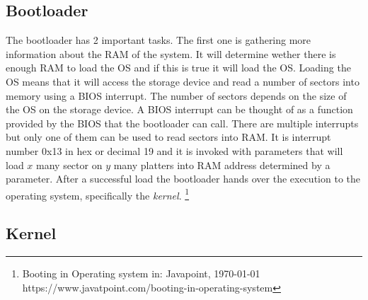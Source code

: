 \subsection{Bootloader}

The bootloader has 2 important tasks. The first one is gathering more
information about the RAM of the system. It will determine wether there is
enough RAM to load the OS and if this is true it will load the OS. Loading
the OS means that it will access the storage device and read a number of
sectors into memory using a BIOS interrupt. The number of sectors depends on
the size of the OS on the storage device. A BIOS interrupt can be thought of
as a function provided by the BIOS that the bootloader can call. There are
multiple interrupts but only one of them can be used to read sectors into
RAM. It is interrupt number 0x13 in hex or decimal 19 and it is invoked with parameters that will load $x$ many sector on $y$ many platters into RAM
address determined by a parameter. After a successful load the bootloader
hands over the execution to the operating system, specifically the \textit{kernel}. \footnote{Booting in Operating system in: Javapoint, \today \\ https://www.javatpoint.com/booting-in-operating-system}

\subsection{Kernel}

